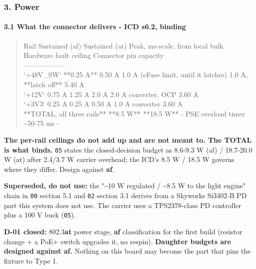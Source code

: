 \documentclass[11pt,a4paper]{article}
\begin{document}
\subsubsection*{3. Power}
\paragraph*{3.1 What the connector delivers - ICD s6.2, binding}
\begin{quote}\small\ttfamily\raggedright
\textbar{} Rail \textbar{} Sustained (af) \textbar{} Sustained (at) \textbar{} Peak, ms-scale, from local bulk \textbar{} Hardware fault ceiling \textbar{} Connector pin capacity \textbar{}\\
\textbar{}---\textbar{}---\textbar{}---\textbar{}---\textbar{}---\textbar{}---\textbar{}\\
\textbar{} `+48V\_SW` \textbar{} {*}{*}0.25 A{*}{*} \textbar{} 0.50 A \textbar{} 1.0 A (eFuse limit, until it latches) \textbar{} 1.0 A, {*}{*}latch off{*}{*} \textbar{} 5.40 A \textbar{}\\
\textbar{} `+12V` \textbar{} 0.75 A \textbar{} 1.25 A \textbar{} 2.0 A \textbar{} 2.0 A converter, OCP \textbar{} 3.60 A \textbar{}\\
\textbar{} `+3V3` \textbar{} 0.25 A \textbar{} 0.25 A \textbar{} 0.50 A \textbar{} 1.0 A converter \textbar{} 3.60 A \textbar{}\\
\textbar{} {*}{*}TOTAL, all three rails{*}{*} \textbar{} {*}{*}8.5 W{*}{*} \textbar{} {*}{*}18.5 W{*}{*} \textbar{} - \textbar{} PSE overload timer \textasciitilde{}50-75 ms \textbar{} - \textbar{}
\end{quote}
\textbf{The per-rail ceilings do not add up and are not meant to. The TOTAL is what binds.} \texttt{05} states the closed-decision budget as 8.6-9.3 W (af) / 18.7-20.0 W (at) after 2.4/3.7 W carrier overhead; the ICD's 8.5 W / 18.5 W governs where they differ. Design against \textbf{af}.

\textbf{Superseded, do not use:} the "\textasciitilde{}10 W regulated / \textasciitilde{}8.5 W to the light engine" chain in \texttt{00} section 5.1 and \texttt{02} section 3.1 derives from a Skyworks Si3402-B PD part this system does not use. The carrier uses a TPS2378-class PD controller plus a 100 V buck (\texttt{05}).

\textbf{D-01 closed:} 802.3\textbf{at} power stage, \textbf{af} classification for the first build (resistor change + a PoE+ switch upgrades it, no respin). \textbf{Daughter budgets are designed against af.} Nothing on this board may become the part that pins the fixture to Type 1.
\end{document}
